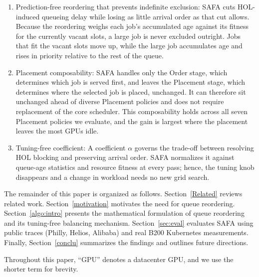 \documentclass{ieeetj}
\begin{document}
\begin{enumerate}
\item Prediction-free reordering that prevents indefinite exclusion: SAFA cuts HOL-induced queueing delay while losing as little arrival order as that cut allows. Because the reordering weighs each job's accumulated age against its fitness for the currently vacant slots, a large job is never excluded outright. Jobs that fit the vacant slots move up, while the large job accumulates age and rises in priority relative to the rest of the queue.
\item Placement composability: SAFA handles only the Order stage, which determines which job is served first, and leaves the Placement stage, which determines where the selected job is placed, unchanged. It can therefore sit unchanged ahead of diverse Placement policies and does not require replacement of the core scheduler. This composability holds across all seven Placement policies we evaluate, and the gain is largest where the placement leaves the most GPUs idle.
\item Tuning-free coefficient: A coefficient $\alpha$ governs the trade-off between resolving HOL blocking and preserving arrival order. SAFA normalizes it against queue-age statistics and resource fitness at every pass; hence, the tuning knob disappears and a change in workload needs no new grid search.
\end{enumerate}

The remainder of this paper is organized as follows. Section~\ref{Related} reviews related work. Section~\ref{motivation} motivates the need for queue reordering. Section~\ref{algo:intro} presents the mathematical formulation of queue reordering and its tuning-free balancing mechanism. Section~\ref{sec:eval} evaluates SAFA using public traces (Philly, Helios, Alibaba) and real B200 Kubernetes measurements. Finally, Section~\ref{conclu} summarizes the findings and outlines future directions.

Throughout this paper, ``GPU'' denotes a datacenter GPU, and we use the shorter term for brevity.
\end{document}
